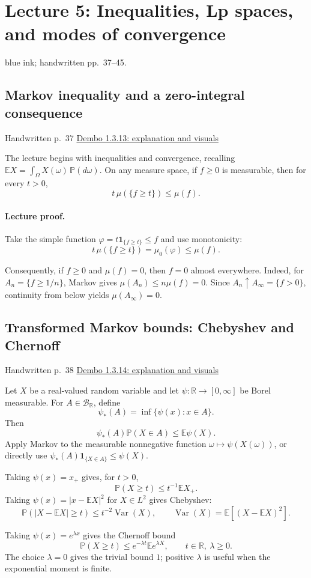 \documentclass[11pt,letterpaper]{article}
\newcommand{\lecturesection}[1]{\subsection{#1}}
\begin{document}
\clearpage
{}
\section{Lecture 5: Inequalities, Lp spaces, and modes of convergence}
{\small blue ink; handwritten pp.\ 37--45.}

\hypertarget{l5-s1}{}
\lecturesection{Markov inequality and a zero-integral consequence}
{\small\textcolor{lectureink}{Handwritten p.\ 37} \quad \href{https://josephrbailey.com/probability/\#entry-1-3-13}{Dembo 1.3.13: explanation and visuals}}

The lecture begins with inequalities and convergence, recalling $\mathbb E X=\int_\Omega X(\omega)\,\mathbb P(d\omega)$. On any measure space, if $f\ge0$ is measurable, then for every $t>0$, \[t\,\mu(\{f\ge t\})\le\mu(f).\]

\paragraph{Lecture proof.}
Take the simple function $\varphi=t\mathbf1_{\{f\ge t\}}\le f$ and use monotonicity: \[t\,\mu(\{f\ge t\})=\mu_0(\varphi)\le\mu(f).\]

Consequently, if $f\ge0$ and $\mu(f)=0$, then $f=0$ almost everywhere. Indeed, for $A_n=\{f\ge1/n\}$, Markov gives $\mu(A_n)\le n\mu(f)=0$. Since $A_n\uparrow A_\infty=\{f>0\}$, continuity from below yields $\mu(A_\infty)=0$.

\hypertarget{l5-s2}{}
\lecturesection{Transformed Markov bounds: Chebyshev and Chernoff}
{\small\textcolor{lectureink}{Handwritten p.\ 38} \quad \href{https://josephrbailey.com/probability/\#entry-1-3-14}{Dembo 1.3.14: explanation and visuals}}

Let $X$ be a real-valued random variable and let $\psi:\mathbb R\to[0,\infty]$ be Borel measurable. For $A\in\mathcal B_{\mathbb R}$, define \[\psi_*(A)=\inf\{\psi(x):x\in A\}.\] Then \[\psi_*(A)\mathbb P(X\in A)\le\mathbb E\psi(X).\] Apply Markov to the measurable nonnegative function $\omega\mapsto\psi(X(\omega))$, or directly use $\psi_*(A)\mathbf1_{\{X\in A\}}\le\psi(X)$.

Taking $\psi(x)=x_+$ gives, for $t>0$, \[\mathbb P(X\ge t)\le t^{-1}\mathbb E X_+.\] Taking $\psi(x)=|x-\mathbb E X|^2$ for $X\in L^2$ gives Chebyshev: \[\mathbb P(|X-\mathbb E X|\ge t)\le t^{-2}\operatorname{Var}(X),\qquad \operatorname{Var}(X)=\mathbb E[(X-\mathbb E X)^2].\]

Taking $\psi(x)=e^{\lambda x}$ gives the Chernoff bound \[\mathbb P(X\ge t)\le e^{-\lambda t}\mathbb E e^{\lambda X},\qquad t\in\mathbb R,\ \lambda\ge0.\] The choice $\lambda=0$ gives the trivial bound $1$; positive $\lambda$ is useful when the exponential moment is finite.
\end{document}
